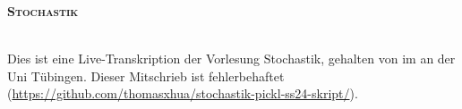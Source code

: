 

\usepackage{hyperref}
\usepackage{xurl}
\usepackage{tikz}
\usepackage{titlesec}
\usepackage{pdfpages}
\usepackage{forloop}
\usepackage{cancel}
\newcommand{\pickl}[1]{\begin{center}\hrulefill\ \texttt{[ \textbf{#1} ]}\ \hrulefill\end{center}}
\renewcommand{\thesection}{\Roman{section}}
\setcounter{tocdepth}{2}
\renewcommand{\contentsname}{Inhaltsverzeichnis}
\newcommand{\Var}{\operatorname{Var}}
\newcommand{\Cov}{\operatorname{Cov}}


\begin{center}
    {\huge{\textsc{\textbf{Stochastik}}}}
\end{center}
~\\
Dies ist eine Live-Transkription der Vorlesung Stochastik, gehalten von  im  an der Uni T\"ubingen. Dieser Mitschrieb ist fehlerbehaftet (\href{https://github.com/thomasxhua/stochastik-pickl-ss24-skript/}{\url{https://github.com/thomasxhua/stochastik-pickl-ss24-skript/}}).
\tableofcontents
\newpage


















